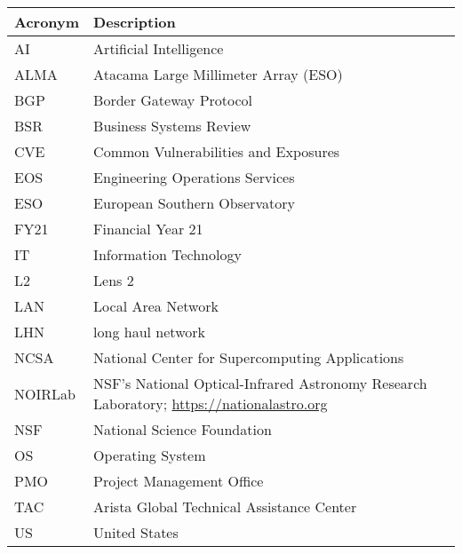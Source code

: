 \addtocounter{table}{-1}
\begin{longtable}{p{}p{}}\hline
\textbf{Acronym} & \textbf{Description}  \\\hline

AI & Artificial Intelligence \\\hline
ALMA & Atacama Large Millimeter Array (ESO) \\\hline
BGP &  Border Gateway Protocol \\\hline
BSR & Business Systems Review \\\hline
CVE & Common Vulnerabilities and Exposures \\\hline
EOS & Engineering Operations Services \\\hline
ESO & European Southern Observatory \\\hline
FY21 & Financial Year 21 \\\hline
IT & Information Technology \\\hline
L2 & Lens 2 \\\hline
LAN & Local Area Network \\\hline
LHN & long haul network \\\hline
NCSA & National Center for Supercomputing Applications \\\hline
NOIRLab & NSF's National Optical-Infrared Astronomy Research Laboratory; \url{https://nationalastro.org} \\\hline
NSF & National Science Foundation \\\hline
OS & Operating System \\\hline
PMO & Project Management Office \\\hline
TAC & Arista Global Technical Assistance Center \\\hline
US & United States \\\hline
\end{longtable}
